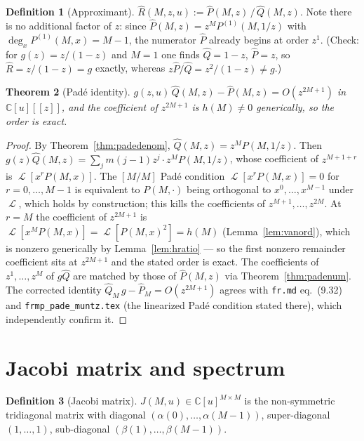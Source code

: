 \documentclass[11pt]{article}
\newtheorem{theorem}{Theorem}[section]
\theoremstyle{definition}
\newtheorem{definition}[theorem]{Definition}
\DeclareMathOperator{\Lop}{\mathcal{L}}
\begin{document}
\begin{definition}[Approximant]\label{def:approx}
$\hat R(M,z,u) := \hat P(M,z)\,/\,\hat Q(M,z)$.
Note there is no additional factor of $z$: since
$\hat P(M,z) = z^{M} P^{(1)}(M,1/z)$ with
$\deg_{x} P^{(1)}(M,x) = M-1$, the numerator $\hat P$ already begins
at order $z^{1}$. (Check: for $g(z) = z/(1-z)$ and $M=1$ one finds
$\hat Q = 1-z$, $\hat P = z$, so $\hat R = z/(1-z) = g$ exactly,
whereas $z\hat P/\hat Q = z^{2}/(1-z) \neq g$.)
\end{definition}

\begin{theorem}[Pad\'e identity]\label{thm:padeid}
$g(z,u)\, \hat Q(M,z) - \hat P(M,z) = O(z^{2M+1})$ in $\mathbb{C}[u][[z]]$,
and the coefficient of $z^{2M+1}$ is $h(M) \neq 0$ generically, so the
order is exact.
\end{theorem}

\begin{proof}
By Theorem~\ref{thm:padedenom}, $\hat Q(M,z) = z^{M} P(M,1/z)$. Then
$g(z) \hat Q(M,z) = \sum_{j} m(j-1) z^{j} \cdot z^{M} P(M,1/z)$, whose
coefficient of $z^{M+1+r}$ is $\Lop[x^{r} P(M,x)]$. The $[M/M]$
Pad\'e condition $\Lop[x^{r} P(M,x)] = 0$ for $r = 0,\ldots,M-1$ is
equivalent to $P(M,\cdot)$ being orthogonal to
$x^{0},\ldots,x^{M-1}$ under $\Lop$, which holds by construction;
this kills the coefficients of $z^{M+1},\ldots,z^{2M}$. At $r = M$
the coefficient of $z^{2M+1}$ is
$\Lop[x^{M} P(M,x)] = \Lop[P(M,x)^{2}] = h(M)$
(Lemma~\ref{lem:vanord}), which is nonzero generically by
Lemma~\ref{lem:hratio} --- so the first nonzero remainder coefficient
sits at $z^{2M+1}$ and the stated order is exact. The coefficients of
$z^{1},\ldots,z^{M}$ of $g\hat Q$ are matched by those of
$\hat P(M,z)$ via Theorem~\ref{thm:padenum}. The corrected identity
$\hat Q_{M}\, g - \hat P_{M} = O(z^{2M+1})$ agrees with
\texttt{fr.md} eq.~(9.32) and \texttt{frmp\_pade\_muntz.tex}
(the linearized Pad\'e condition stated there), which independently
confirm it.
\end{proof}

\section{Jacobi matrix and spectrum}\label{sec:jacobi}

\begin{definition}[Jacobi matrix]\label{def:Jacobi}
$J(M,u) \in \mathbb{C}[u]^{M\times M}$ is the non-symmetric tridiagonal
matrix with diagonal $(\alpha(0),\ldots,\alpha(M-1))$, super-diagonal
$(1,\ldots,1)$, sub-diagonal $(\beta(1),\ldots,\beta(M-1))$.
\end{definition}
\end{document}
